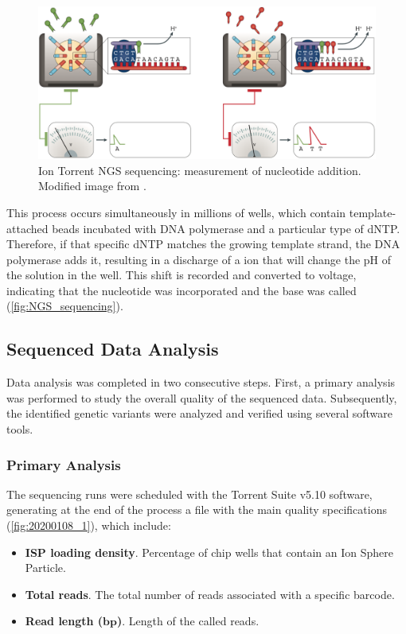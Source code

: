 \begin{figure}[ht]
    \centering
    \includegraphics[width=\textwidth]{Images/chapter_3/NGS_sequencing.png}
    \caption{Ion Torrent\texttrademark{} NGS sequencing: measurement of nucleotide addition. Modified image from \cite{NGS}.}
    \label{fig:NGS_sequencing}
\end{figure}

This process occurs simultaneously in millions of wells, which contain template-attached beads incubated with DNA polymerase and a particular type of dNTP. Therefore, if that specific dNTP matches the growing template strand, the DNA polymerase adds it, resulting in a discharge of a  ion that will change the pH of the solution in the well. This shift is recorded and converted to voltage, indicating that the nucleotide was incorporated and the base was called (\autoref{fig:NGS_sequencing}).

\subsection{Sequenced Data Analysis}

Data analysis was completed in two consecutive steps. First, a primary analysis was performed to study the overall quality of the sequenced data. Subsequently, the identified genetic variants were analyzed and verified using several software tools.

\subsubsection{Primary Analysis}

The sequencing runs were scheduled with the Torrent Suite\texttrademark{} v5.10 software, generating at the end of the process a file with the main quality specifications (\autoref{fig:20200108_1}), which include:
\begin{itemize}
    \item \textbf{ISP loading density}. Percentage of chip wells that contain an Ion Sphere\texttrademark{} Particle.
    \item \textbf{Total reads}. The total number of reads associated with a specific barcode.
    \item \textbf{Read length ($\boldsymbol{bp}$)}. Length of the called reads.
\end{itemize}

